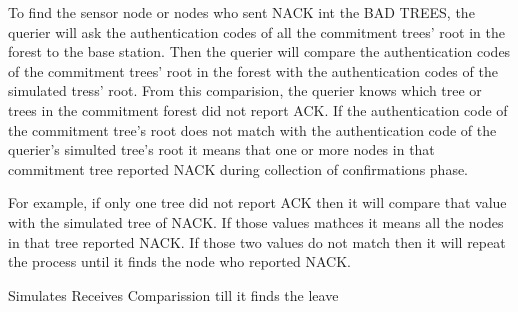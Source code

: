 To find the sensor node or nodes who sent NACK int the BAD TREES, the querier will ask the authentication codes of all the commitment trees' root in the forest to the base station. Then the querier will compare the authentication codes of the commitment trees' root in the forest with the authentication codes of the simulated tress' root. From this comparision, the querier knows which tree or trees in the commitment forest did not report ACK. If the authentication code of the commitment tree's root does not match with the authentication code of the querier's simulted tree's root it means that one or more nodes in that commitment tree reported NACK during collection of confirmations phase. 

For example, if only one tree did not report ACK then it will compare that value with the simulated tree of NACK. If those values mathces it means all the nodes in that tree reported NACK. If those two values do not match then it will repeat the process until it finds the node who reported NACK.




Simulates
Receives
Comparission till it finds the leave

